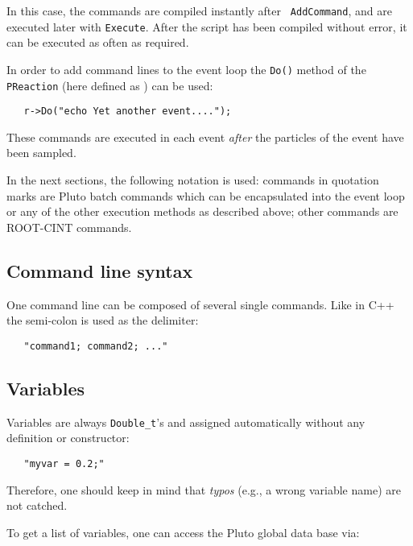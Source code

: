 In this case, the commands are compiled instantly after {\tt
  AddCommand}, and are executed later with {\tt Execute}. After the script
has been compiled without error, it can be
executed as often as required.

In order to add command lines to the event loop the {\tt Do()} method
of the {\tt PReaction} (here defined as )  can be used:

\begin{verbatim}
   r->Do("echo Yet another event....");
\end{verbatim}

These commands are executed in each event {\it after} the particles
of the event have been sampled. 

In the next sections, the following notation is used: commands in
quotation marks are Pluto batch commands which can be encapsulated
into the event loop or any of the other execution methods as described
above; other commands are ROOT-CINT commands.

\subsection{Command line syntax}

One command line can be composed of several single commands.  Like in
C++ the semi-colon is used as the delimiter:

\begin{verbatim}
   "command1; command2; ..."
\end{verbatim}


\subsection{Variables}

Variables are always {\tt Double\_t}'s and assigned automatically
without any definition or constructor:

\begin{verbatim}
   "myvar = 0.2;"
\end{verbatim}

Therefore, one should keep in mind that {\it typos} (e.g., a wrong
variable name) are not catched.



To get a list of variables, one can access the Pluto global data base via:

